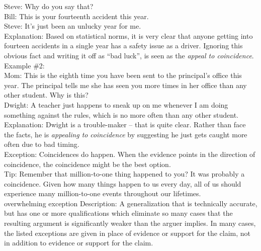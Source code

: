 \documentclass[a4paper,12pt,single,pdftex]{scrbook}
\begin{document}
    
      Steve: Why do you say that?
    \\

    
      Bill: This is your fourteenth accident this year.
    \\

    
      Steve: It’s just been an unlucky year for me.
    \\

    
      Explanation: Based on statistical norms, it is very clear that anyone getting into fourteen accidents in a single year has a safety issue as a driver.  Ignoring this obvious fact and writing it off as “bad luck”, is seen as the {\it appeal to coincidence}.
    \\

    
      Example \#2: 
    \\

    
      Mom: This is the eighth time you have been sent to the principal's office this year.  The principal tells me she has seen you more times in her office than any other student.  Why is this?
    \\

    
      Dwight: A teacher just happens to sneak up on me whenever I am doing something against the rules, which is no more often than any other student.
    \\

    
      Explanation: Dwight is a trouble-maker -- that is quite clear.  Rather than face the facts, he is {\it appealing to} {\it coincidence }by suggesting he just gets caught more often due to bad timing.
    \\

    
      Exception: Coincidences do happen.  When the evidence points in the direction of coincidence, the coincidence might be the best option.
    \\

    
      Tip: Remember that million-to-one thing happened to you? It was probably a coincidence. Given how many things happen to us every day, all of us should experience many million-to-one events throughout our lifetimes.
    \\

  

overwhelming exception
    Description: A generalization that is technically accurate, but has one or more qualifications which eliminate so many cases that the resulting argument is significantly weaker than the arguer implies.  In many cases, the listed exceptions are given in place of evidence or support for the claim, not in addition to evidence or support for the claim.
\end{document}
